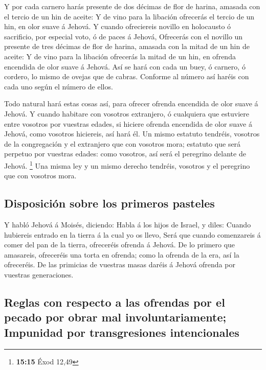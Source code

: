  Y por cada carnero harás presente de dos décimas de flor
de harina, amasada con el tercio de un hin de aceite:  Y
de vino para la libación ofrecerás el tercio de un hin, en olor suave á
Jehová.  Y cuando ofreciereis novillo en holocausto ó
sacrificio, por especial voto, ó de paces á Jehová, 
Ofrecerás con el novillo un presente de tres décimas de flor de harina,
amasada con la mitad de un hin de aceite:  Y de vino para
la libación ofrecerás la mitad de un hin, en ofrenda encendida de olor
suave á Jehová.  Así se hará con cada un buey, ó carnero,
ó cordero, lo mismo de ovejas que de cabras.  Conforme al
número así haréis con cada uno según el número de ellos.

 Todo natural hará estas cosas así, para ofrecer ofrenda
encendida de olor suave á Jehová.  Y cuando habitare con
vosotros extranjero, ó cualquiera que estuviere entre vosotros por
vuestras edades, si hiciere ofrenda encendida de olor suave á Jehová,
como vosotros hiciereis, así hará él.  Un mismo estatuto
tendréis, vosotros de la congregación y el extranjero que con vosotros
mora; estatuto que será perpetuo por vuestras edades: como vosotros, así
será el peregrino delante de Jehová. \footnote{\textbf{15:15} Éxod 12,49}
 Una misma ley y un mismo derecho tendréis, vosotros y el
peregrino que con vosotros mora.

\hypertarget{disposiciuxf3n-sobre-los-primeros-pasteles}{%
\subsection{Disposición sobre los primeros
pasteles}\label{disposiciuxf3n-sobre-los-primeros-pasteles}}

 Y habló Jehová á Moisés, diciendo:  Habla
á los hijos de Israel, y diles: Cuando hubiereis entrado en la tierra á
la cual yo os llevo,  Será que cuando comenzareis á comer
del pan de la tierra, ofreceréis ofrenda á Jehová.  De lo
primero que amasareis, ofreceréis una torta en ofrenda; como la ofrenda
de la era, así la ofreceréis.  De las primicias de
vuestras masas daréis á Jehová ofrenda por vuestras generaciones.

\hypertarget{reglas-con-respecto-a-las-ofrendas-por-el-pecado-por-obrar-mal-involuntariamente-impunidad-por-transgresiones-intencionales}{%
\subsection{Reglas con respecto a las ofrendas por el pecado por obrar
mal involuntariamente; Impunidad por transgresiones
intencionales}\label{reglas-con-respecto-a-las-ofrendas-por-el-pecado-por-obrar-mal-involuntariamente-impunidad-por-transgresiones-intencionales}}

